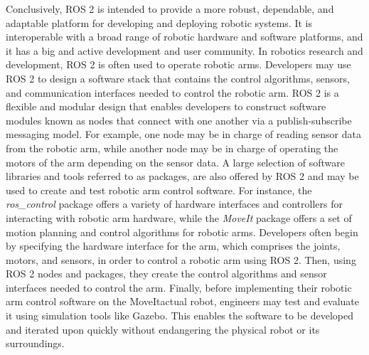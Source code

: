 \documentclass[12pt,oneside]{article}
\begin{document}
Conclusively, ROS 2 is intended to provide a more robust, dependable, and adaptable platform for developing and deploying robotic systems. It is interoperable with a broad range of robotic hardware and software platforms, and it has a big and active development and user community.
In robotics research and development, ROS 2 is often used to operate robotic arms. Developers may use ROS 2 to design a software stack that contains the control algorithms, sensors, and communication interfaces needed to control the robotic arm. ROS 2 is a flexible and modular design that enables developers to construct software modules known as nodes that connect with one another via a publish-subscribe messaging model. For example, one node may be in charge of reading sensor data from the robotic arm, while another node may be in charge of operating the motors of the arm depending on the sensor data. A large selection of software libraries and tools referred to as packages, are also offered by ROS 2 and may be used to create and test robotic arm control software. For instance, the \textit{ros\_control} package offers a variety of hardware interfaces and controllers for interacting with robotic arm hardware, while the \textit{MoveIt} package offers a set of motion planning and control algorithms for robotic arms. Developers often begin by specifying the hardware interface for the arm, which comprises the joints, motors, and sensors, in order to control a robotic arm using ROS 2. Then, using ROS 2 nodes and packages, they create the control algorithms and sensor interfaces needed to control the arm. Finally, before implementing their robotic arm control software on the MoveItactual robot, engineers may test and evaluate it using simulation tools like Gazebo. This enables the software to be developed and iterated upon quickly without endangering the physical robot or its surroundings.
\end{document}
